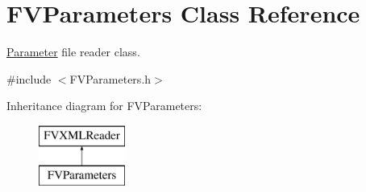 \hypertarget{classFVL_1_1FVParameters}{
\section{FVParameters Class Reference}
\label{dd/df8/classFVL_1_1FVParameters}
}


\hyperlink{classParameter}{Parameter} file reader class.  




{\ttfamily \#include $<$FVParameters.h$>$}

Inheritance diagram for FVParameters:\begin{figure}[H]
\begin{center}
\leavevmode
\includegraphics[height=2.000000cm]{dd/df8/classFVL_1_1FVParameters}
\end{center}
\end{figure}
